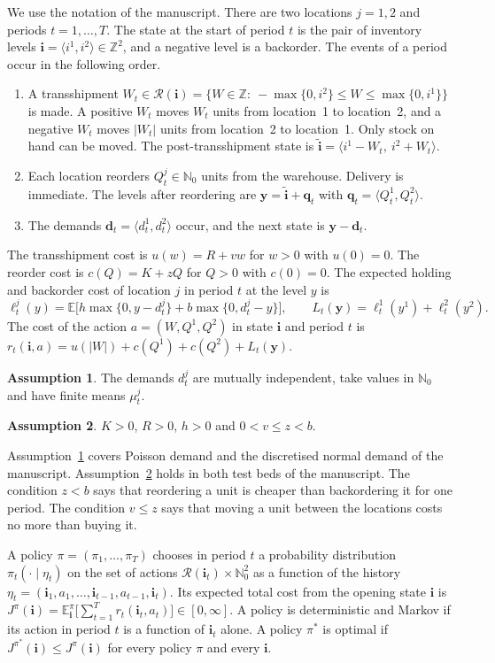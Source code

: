 \documentclass[11pt]{article}
\renewcommand{\vec}[1]{\boldsymbol{#1}}
\newcommand{\E}{\mathbb{E}}
\newcommand{\Z}{\mathbb{Z}}
\newcommand{\N}{\mathbb{N}_0}
\newcommand{\R}{\mathcal{R}}
\theoremstyle{definition}
\newtheorem{assumption}{Assumption}
\begin{document}
We use the notation of the manuscript. There are two locations $j=1,2$ and periods $t=1,\ldots,T$. The state at the start of period $t$ is the pair of inventory levels $\vec{i}=\langle i^1,i^2\rangle\in\Z^2$, and a negative level is a backorder. The events of a period occur in the following order.
\begin{enumerate}
\item A transshipment $W_t\in\R(\vec{i})=\{W\in\Z:\ -\max\{0,i^2\}\le W\le \max\{0,i^1\}\}$ is made. A positive $W_t$ moves $W_t$ units from location~1 to location~2, and a negative $W_t$ moves $|W_t|$ units from location~2 to location~1. Only stock on hand can be moved. The post-transshipment state is $\tilde{\vec{i}}=\langle i^1-W_t,\ i^2+W_t\rangle$.
\item Each location reorders $Q^j_t\in\N$ units from the warehouse. Delivery is immediate. The levels after reordering are $\vec{y}=\tilde{\vec{i}}+\vec{q}_t$ with $\vec{q}_t=\langle Q^1_t,Q^2_t\rangle$.
\item The demands $\vec{d}_t=\langle d^1_t,d^2_t\rangle$ occur, and the next state is $\vec{y}-\vec{d}_t$.
\end{enumerate}
The transshipment cost is $u(w)=R+vw$ for $w>0$ with $u(0)=0$. The reorder cost is $c(Q)=K+zQ$ for $Q>0$ with $c(0)=0$. The expected holding and backorder cost of location $j$ in period $t$ at the level $y$ is
\[
\ell^j_t(y)=\E\big[h\max\{0,y-d^j_t\}+b\max\{0,d^j_t-y\}\big],
\qquad L_t(\vec{y})=\ell^1_t(y^1)+\ell^2_t(y^2).
\]
The cost of the action $a=(W,Q^1,Q^2)$ in state $\vec{i}$ and period $t$ is $r_t(\vec{i},a)=u(|W|)+c(Q^1)+c(Q^2)+L_t(\vec{y})$.

\begin{assumption}\label{ass:demand}
The demands $d^j_t$ are mutually independent, take values in $\N$ and have finite means $\mu^j_t$.
\end{assumption}

\begin{assumption}\label{ass:cost}
$K>0$, $R>0$, $h>0$ and $0<v\le z<b$.
\end{assumption}

Assumption~\ref{ass:demand} covers Poisson demand and the discretised normal demand of the manuscript. Assumption~\ref{ass:cost} holds in both test beds of the manuscript. The condition $z<b$ says that reordering a unit is cheaper than backordering it for one period. The condition $v\le z$ says that moving a unit between the locations costs no more than buying it.

A policy $\pi=(\pi_1,\ldots,\pi_T)$ chooses in period $t$ a probability distribution $\pi_t(\cdot\mid\eta_t)$ on the set of actions $\R(\vec{i}_t)\times\N^2$ as a function of the history $\eta_t=(\vec{i}_1,a_1,\ldots,\vec{i}_{t-1},a_{t-1},\vec{i}_t)$. Its expected total cost from the opening state $\vec{i}$ is $J^\pi(\vec{i})=\E^\pi_{\vec{i}}\big[\sum_{t=1}^T r_t(\vec{i}_t,a_t)\big]\in[0,\infty]$. A policy is deterministic and Markov if its action in period $t$ is a function of $\vec{i}_t$ alone. A policy $\pi^*$ is optimal if $J^{\pi^*}(\vec{i})\le J^{\pi}(\vec{i})$ for every policy $\pi$ and every $\vec{i}$.
\end{document}
